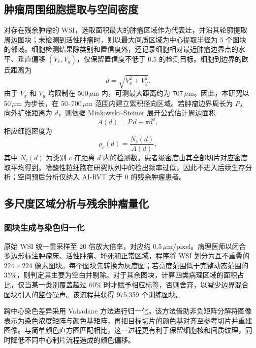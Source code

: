 \subsection{肿瘤周围细胞提取与空间密度}
对存在残余肿瘤的 WSI，选取面积最大的肿瘤区域作为代表灶，并沿其轮廓提取周边图块；未检测到活性肿瘤时，则以最大间质区域为中心提取半径为 5 个图块的邻域。细胞检测结果除类别和置信度外，还记录细胞相对最近肿瘤边界点的水平、垂直偏移 $(V_x,V_y)$，仅保留置信度不低于 0.5 的检测目标。细胞到边界的欧氏距离为
\begin{equation}
d=\sqrt{V_x^2+V_y^2}.
\end{equation}
由于 $V_x$ 和 $V_y$ 均限制在 $500\,\mu\mathrm{m}$ 内，可测最大距离约为 $707\,\mu\mathrm{m}$。因此，本研究以 $50\,\mu\mathrm{m}$ 为步长，在 $50$--$700\,\mu\mathrm{m}$ 范围内建立累积径向区域。若肿瘤边界周长为 $P$，向外扩张距离为 $d$，则依据 Minkowski--Steiner 展开公式估计周边面积
\begin{equation}
A(d)=P\,d+\pi d^2,
\end{equation}
相应细胞密度为
\begin{equation}
\rho_c(d)=\frac{N_c(d)}{A(d)},
\end{equation}
其中 $N_c(d)$ 为类别 $c$ 在距离 $d$ 内的检测数。患者级密度由其全部切片对应密度取平均得到。嗜酸性粒细胞在研究队列中的检出频率过低，因此不进入后续生存分析；空间预后分析仅纳入 AI-RVT 大于 0 的残余肿瘤患者。

\subsection{多尺度区域分析与残余肿瘤量化}
\subsubsection{图块生成与染色归一化}
原始 WSI 统一重采样至 20 倍放大倍率，对应约 $0.5\,\mu\mathrm{m}/\mathrm{pixel}$。病理医师以闭合多边形标注肿瘤床、活性肿瘤、坏死和正常区域，程序将 WSI 划分为互不重叠的 $224\times224$ 像素图块。每个图块先转换为灰度图；若亮度范围低于完整动态范围的 35\%，则判定其主要为空白并剔除。对于其余图块，计算四类病理区域的面积占比，仅当某一类别覆盖超过 60\% 时才赋予相应标签，否则舍弃，以减少边界混合图块引入的监督噪声。该流程共获得 975,359 个训练图块。

跨中心染色差异采用 Vahadane 方法进行归一化。该方法借助非负矩阵分解将图像表示为染色浓度矩阵与颜色基矩阵，再把目标切片的颜色基对齐至参考切片并重建图像。与简单颜色直方图匹配相比，这一过程更有利于保留细胞核和间质纹理，同时降低不同中心制片流程造成的颜色偏移。

